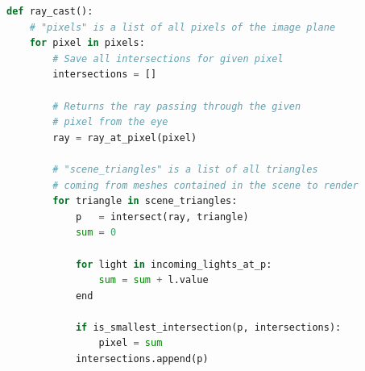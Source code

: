 \begin{lstlisting}[language=Python,caption={Eine abstrakte Umsetzung des Ray
        Castings\protect\footnotemark.},label={fig:ray_casting:high_level},captionpos=b,emph={ray_cast}]
def ray_cast():
    # "pixels" is a list of all pixels of the image plane
    for pixel in pixels:
        # Save all intersections for given pixel
        intersections = []

        # Returns the ray passing through the given
        # pixel from the eye
        ray = ray_at_pixel(pixel)

        # "scene_triangles" is a list of all triangles
        # coming from meshes contained in the scene to render
        for triangle in scene_triangles:
            p   = intersect(ray, triangle)
            sum = 0

            for light in incoming_lights_at_p:
                sum = sum + l.value
            end

            if is_smallest_intersection(p, intersections):
                pixel = sum
            intersections.append(p)
\end{lstlisting}

